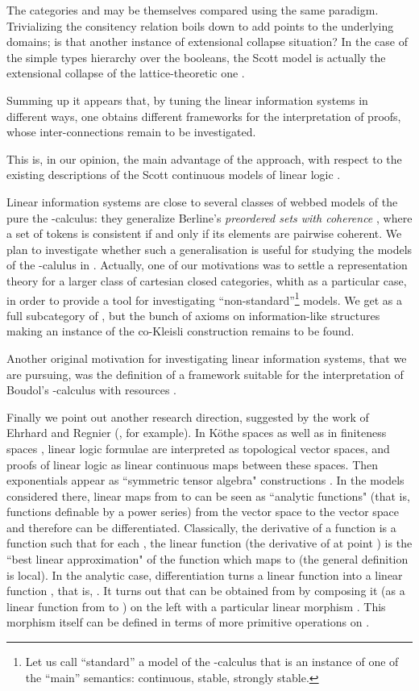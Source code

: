 \documentclass[copyright,creativecommons]{eptcs}
\begin{document}
The categories  and  may be themselves compared using the same paradigm. Trivializing the consitency relation boils down to add points to the underlying domains; is that another instance of extensional collapse situation? In the case of  the simple types hierarchy  over the booleans, the Scott model is actually the extensional collapse of the lattice-theoretic one \cite{Bucciarelli96}.

Summing up it appears that, by  tuning the linear information systems in different ways, one  obtains different frameworks for the interpretation of proofs, whose inter-connections remain to be investigated.

This is, in our opinion, the main advantage of the approach, with respect to the existing descriptions of the Scott continuous models of linear logic \cite{Barr79, Huth94, Huth94b, Winskel99}. 

Linear information systems are close to several classes of webbed models of the pure the -calculus: they generalize Berline's {\em preordered sets with coherence} \cite{Berline00}, where a set of tokens is consistent if and only if its elements are pairwise coherent. We plan to investigate whether such a generalisation is useful for studying the models of the -calulus in  . Actually, one of our motivations was to settle a representation theory for a larger class of cartesian closed categories, whith  as a particular case, in order to provide a tool for investigating ``non-standard''\footnote{Let us call ``standard'' a  model of the -calculus that is an instance of one of the ``main'' semantics: continuous, stable, strongly stable.} models. We get  as a full subcategory of , but the bunch of axioms on information-like structures making  an instance of the co-Kleisli construction remains to be found.

Another original motivation for investigating linear information systems, that we are pursuing, was the definition of a framework suitable for the interpretation of Boudol's -calculus with resources \cite{Boudol93}.

Finally we point out another research direction, suggested by the work of Ehrhard and Regnier (\cite{Ehrhard06}, for example). In K\"{o}the spaces \cite{Ehrhard02} as well as in finiteness spaces \cite{Ehrhard05}, linear logic formulae are interpreted as topological vector spaces, and proofs of linear logic as linear continuous maps between these spaces. Then exponentials appear as ``symmetric tensor algebra" constructions \cite{Blute93}. In the models considered there, linear maps from  to  can be seen as ``analytic functions" (that is, functions definable by a power series) from the vector space  to the vector space  and therefore can be differentiated.  Classically, the derivative of a function  is a function  such that for each , the linear function  (the derivative of  at point ) is the ``best linear approximation" of the function  which maps  to  (the general definition is local). In the analytic case, differentiation turns a linear function  into a linear function , that is, . It turns out that  can be obtained from  by composing it (as a linear function from  to ) on the left with a particular linear morphism . This morphism itself can be defined in terms of more primitive operations on . 
\end{document}
